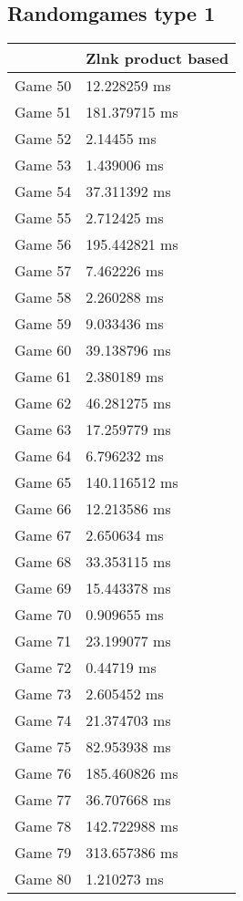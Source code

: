 \subsection{Randomgames type 1}
\begin{tabular}{|l|l|}
	\hline
	& Zlnk product based \\ \hline
	Game 50 & 12.228259 ms \\ \hline
	Game 51 & 181.379715 ms \\ \hline
	Game 52 & 2.14455 ms \\ \hline
	Game 53 & 1.439006 ms \\ \hline
	Game 54 & 37.311392 ms \\ \hline
	Game 55 & 2.712425 ms \\ \hline
	Game 56 & 195.442821 ms \\ \hline
	Game 57 & 7.462226 ms \\ \hline
	Game 58 & 2.260288 ms \\ \hline
	Game 59 & 9.033436 ms \\ \hline
	Game 60 & 39.138796 ms \\ \hline
	Game 61 & 2.380189 ms \\ \hline
	Game 62 & 46.281275 ms \\ \hline
	Game 63 & 17.259779 ms \\ \hline
	Game 64 & 6.796232 ms \\ \hline
	Game 65 & 140.116512 ms \\ \hline
	Game 66 & 12.213586 ms \\ \hline
	Game 67 & 2.650634 ms \\ \hline
	Game 68 & 33.353115 ms \\ \hline
	Game 69 & 15.443378 ms \\ \hline
	Game 70 & 0.909655 ms \\ \hline
	Game 71 & 23.199077 ms \\ \hline
	Game 72 & 0.44719 ms \\ \hline
	Game 73 & 2.605452 ms \\ \hline
	Game 74 & 21.374703 ms \\ \hline
	Game 75 & 82.953938 ms \\ \hline
	Game 76 & 185.460826 ms \\ \hline
	Game 77 & 36.707668 ms \\ \hline
	Game 78 & 142.722988 ms \\ \hline
	Game 79 & 313.657386 ms \\ \hline
	Game 80 & 1.210273 ms \\ \hline

\end{tabular}

